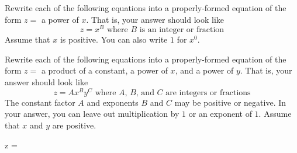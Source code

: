 
Rewrite each of the following equations into a properly-formed equation of the form $z = $ a power of $x$.
That is, your answer should look like
\begin{equation*}
 z = x^B \text{ where $B$ is an integer or fraction}
\end{equation*}
Assume that $x$ is positive.
You can also write $1$ for $x^0$.

\begin{multicols}{2}
 \begin{ProblemSet}[pencil space=1in]
 \end{ProblemSet}
\end{multicols}

\newpage

Rewrite each of the following equations into a properly-formed equation of the form $z = $ a product of a constant, a power of $x$, and a power of $y$.
That is, your answer should look like
\begin{equation*}
 z = A x^B y^C \text{ where $A$, $B$, and $C$ are integers or fractions}
\end{equation*}
The constant factor $A$ and exponents $B$ and $C$ may be positive or negative.
In your answer, you can leave out multiplication by $1$ or an exponent of $1$.
Assume that $x$ and $y$ are positive.

\begin{multicols}{2}
 \begin{ProblemSet}[pencil space=2in]

  \begin{Problem}
   \Large
   \begin{LeftEquation}
    z = 
   \end{LeftEquation}
  \end{Problem}

 \end{ProblemSet}
\end{multicols}

